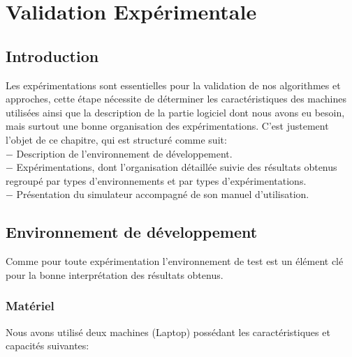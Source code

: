 
\chapter{Validation Expérimentale } %

\label{Chapter4} %


\section{Introduction}
Les expérimentations sont essentielles pour la validation de nos algorithmes et approches, cette étape nécessite de déterminer les caractéristiques des machines utilisées ainsi que la description de la partie logiciel dont nous avons eu besoin, mais surtout une bonne organisation des expérimentations. C'est justement l'objet de ce chapitre, qui est structuré comme suit:\\
 $-$ Description de l'environnement de développement.\\
 $-$ Expérimentations, dont l'organisation détaillée suivie des résultats obtenus regroupé par types d'environnements et par types d'expérimentations.\\
 $-$ Présentation du simulateur accompagné de son manuel d'utilisation.


\section{Environnement de développement}
Comme pour toute expérimentation l'environnement de test est un élément clé pour la bonne interprétation des résultats obtenus.

\subsection{Matériel}
Nous avons utilisé deux machines (Laptop) possédant les caractéristiques et capacités suivantes:

